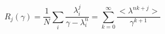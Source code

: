 \begin{equation}
R_j (\gamma) =  \frac 1 N \sum_i\frac{\lambda_i^{j}}{\gamma-\lambda_i^n}
= \sum_{k=0}^\infty\frac {< \lambda^{nk+j}>}{\gamma^{k+1}}
\end{equation}

